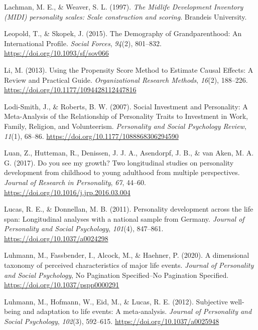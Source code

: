\documentclass[
  english,
  man, noextraspace]{apa7}
\begin{document}
\leavevmode\hypertarget{ref-lachmanMidlifeDevelopmentInventory1997}{}%
Lachman, M. E., \& Weaver, S. L. (1997). \emph{The Midlife Development Inventory (MIDI) personality scales: Scale construction and scoring}. Brandeis University.

\leavevmode\hypertarget{ref-leopoldDemographyGrandparenthoodInternational2015}{}%
Leopold, T., \& Skopek, J. (2015). The Demography of Grandparenthood: An International Profile. \emph{Social Forces}, \emph{94}(2), 801--832. \url{https://doi.org/10.1093/sf/sov066}

\leavevmode\hypertarget{ref-liUsingPropensityScore2013}{}%
Li, M. (2013). Using the Propensity Score Method to Estimate Causal Effects: A Review and Practical Guide. \emph{Organizational Research Methods}, \emph{16}(2), 188--226. \url{https://doi.org/10.1177/1094428112447816}

\leavevmode\hypertarget{ref-lodi-smithSocialInvestmentPersonality2007}{}%
Lodi-Smith, J., \& Roberts, B. W. (2007). Social Investment and Personality: A Meta-Analysis of the Relationship of Personality Traits to Investment in Work, Family, Religion, and Volunteerism. \emph{Personality and Social Psychology Review}, \emph{11}(1), 68--86. \url{https://doi.org/10.1177/1088868306294590}

\leavevmode\hypertarget{ref-luanYouSeeMy2017}{}%
Luan, Z., Hutteman, R., Denissen, J. J. A., Asendorpf, J. B., \& van Aken, M. A. G. (2017). Do you see my growth? Two longitudinal studies on personality development from childhood to young adulthood from multiple perspectives. \emph{Journal of Research in Personality}, \emph{67}, 44--60. \url{https://doi.org/10.1016/j.jrp.2016.03.004}

\leavevmode\hypertarget{ref-lucasPersonalityDevelopmentLife2011}{}%
Lucas, R. E., \& Donnellan, M. B. (2011). Personality development across the life span: Longitudinal analyses with a national sample from Germany. \emph{Journal of Personality and Social Psychology}, \emph{101}(4), 847--861. \url{https://doi.org/10.1037/a0024298}

\leavevmode\hypertarget{ref-luhmannDimensionalTaxonomyPerceived2020}{}%
Luhmann, M., Fassbender, I., Alcock, M., \& Haehner, P. (2020). A dimensional taxonomy of perceived characteristics of major life events. \emph{Journal of Personality and Social Psychology}, No Pagination Specified--No Pagination Specified. \url{https://doi.org/10.1037/pspp0000291}

\leavevmode\hypertarget{ref-luhmannSubjectiveWellbeingAdaptation2012}{}%
Luhmann, M., Hofmann, W., Eid, M., \& Lucas, R. E. (2012). Subjective well-being and adaptation to life events: A meta-analysis. \emph{Journal of Personality and Social Psychology}, \emph{102}(3), 592--615. \url{https://doi.org/10.1037/a0025948}
\end{document}

